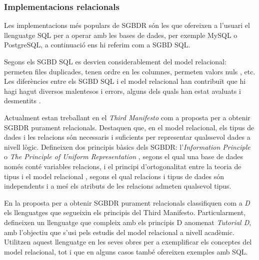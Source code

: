 






\subsubsection{Implementacions relacionals}


Les implementacions més populars de \gls{SGBDR} són les que ofereixen a
l'usuari el llenguatge \gls{SQL} per a operar amb les bases de dades, per
exemple MySQL o PostgreSQL, a continuació ens hi referim com a \gls{SGBD}
\gls{SQL}.  

Segons \textcite{datedarwen13:notosql_notonosql} els \gls{SGBD} \gls{SQL} es
desvien considerablement del model relacional: permeten files
duplicades, tenen ordre en les columnes, permeten valors
nuls \parencite{date08:nulls}, etc.  Les diferències entre els \gls{SGBD}
\gls{SQL} i el model relacional han contribuït que hi hagi hagut diversos
malentesos i errors, alguns dels quals han estat avaluats i
desmentits \parencite{dbdebunk,date06}.
  

Actualment \textcite{date:thethirdmanifesto} estan treballant en el
\emph{Third Manifesto} com a proposta per a obtenir \gls{SGBDR} purament
relacionals. Destaquen que, en el model relacional, els tipus de dades
i les relacions són necessaris i suficients per representar qualssevol
dades a nivell lògic. %
Defineixen dos principis bàsics dels \gls{SGBDR}: l'\emph{Information
  Principle} o \emph{The Principle of Uniform
  Representation} \parencite{date:dictionary}, segons el qual una base
de dades només conté variables relacions, i el principi
d'ortogonalitat entre la teoria de tipus i el model
relacional \parencite[cap.~6]{date06}, segons el qual relacions i
tipus de dades són independents i a meś els atributs de les relacions
admeten qualsevol tipus.  

En la proposta per a obtenir \gls{SGBDR} purament relacionals
\textcite{date06:_datab_types_relat_model,date:tutoriald} classifiquen
com a \emph{D} els llenguatges que segueixin els principis del Third
Manifesto. Particularment, defineixen un llenguatge que compleix amb
els principis D anomenat \emph{Tutorial D}, amb l'objectiu que s'usi
pels estudis del model relacional a nivell acadèmic. Utilitzen aquest
llenguatge en les seves obres per a exemplificar els conceptes
del model relacional, tot i que en alguns casos també ofereixen
exemples amb \gls{SQL}.


